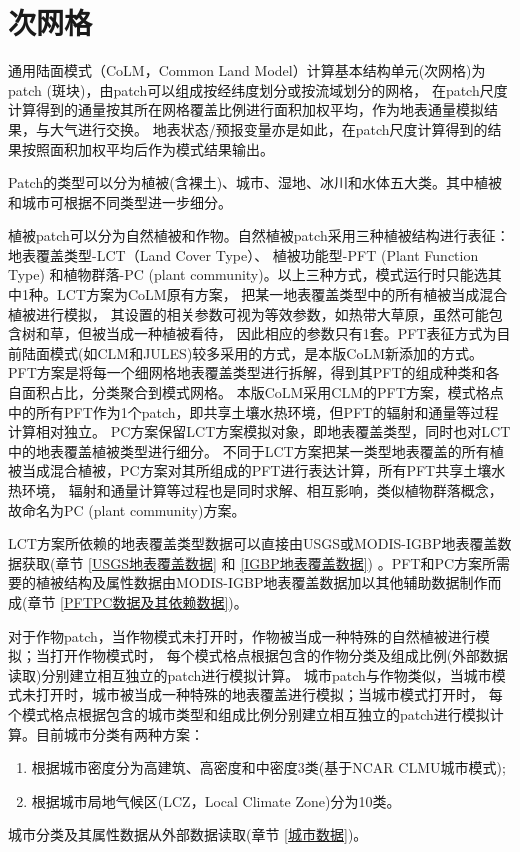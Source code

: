 \section{次网格}\label{次网格}

通用陆面模式（CoLM，Common Land Model）计算基本结构单元(次网格)为patch (斑块)，由patch可以组成按经纬度划分或按流域划分的网格，
在patch尺度计算得到的通量按其所在网格覆盖比例进行面积加权平均，作为地表通量模拟结果，与大气进行交换。
地表状态/预报变量亦是如此，在patch尺度计算得到的结果按照面积加权平均后作为模式结果输出。


Patch的类型可以分为植被(含裸土)、城市、湿地、冰川和水体五大类。其中植被和城市可根据不同类型进一步细分。


植被patch可以分为自然植被和作物。自然植被patch采用三种植被结构进行表征：地表覆盖类型-LCT（Land Cover Type）、
植被功能型-PFT (Plant Function Type) 和植物群落-PC (plant community)。以上三种方式，模式运行时只能选其中1种。LCT方案为CoLM原有方案，
把某一地表覆盖类型中的所有植被当成混合植被进行模拟，
其设置的相关参数可视为等效参数，如热带大草原，虽然可能包含树和草，但被当成一种植被看待，
因此相应的参数只有1套。PFT表征方式为目前陆面模式(如CLM和JULES)较多采用的方式，是本版CoLM新添加的方式。
PFT方案是将每一个细网格地表覆盖类型进行拆解，得到其PFT的组成种类和各自面积占比，分类聚合到模式网格。
本版CoLM采用CLM的PFT方案，模式格点中的所有PFT作为1个patch，即共享土壤水热环境，但PFT的辐射和通量等过程计算相对独立。
PC方案保留LCT方案模拟对象，即地表覆盖类型，同时也对LCT中的地表覆盖植被类型进行细分。
不同于LCT方案把某一类型地表覆盖的所有植被当成混合植被，PC方案对其所组成的PFT进行表达计算，所有PFT共享土壤水热环境，
辐射和通量计算等过程也是同时求解、相互影响，类似植物群落概念，故命名为PC (plant community)方案。


LCT方案所依赖的地表覆盖类型数据可以直接由USGS或MODIS-IGBP地表覆盖数据获取(章节 \ref{USGS地表覆盖数据} 和 \ref{IGBP地表覆盖数据}) 
。PFT和PC方案所需要的植被结构及属性数据由MODIS-IGBP地表覆盖数据加以其他辅助数据制作而成(章节 \ref{PFTPC数据及其依赖数据})。


对于作物patch，当作物模式未打开时，作物被当成一种特殊的自然植被进行模拟；当打开作物模式时，
每个模式格点根据包含的作物分类及组成比例(外部数据读取)分别建立相互独立的patch进行模拟计算。
城市patch与作物类似，当城市模式未打开时，城市被当成一种特殊的地表覆盖进行模拟；当城市模式打开时，
每个模式格点根据包含的城市类型和组成比例分别建立相互独立的patch进行模拟计算。目前城市分类有两种方案：
\begin{enumerate}
    \item 根据城市密度分为高建筑、高密度和中密度3类(基于NCAR CLMU城市模式);
    \item 根据城市局地气候区(LCZ，Local Climate Zone)分为10类。
\end{enumerate}
城市分类及其属性数据从外部数据读取(章节 \ref{城市数据})。

